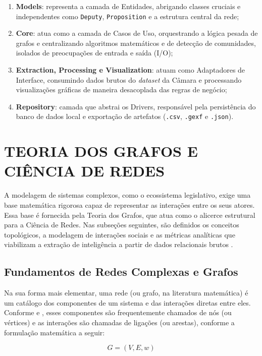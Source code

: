 \documentclass[
      12pt,
      a4paper,
      openright,
      oneside,
      chapter=TITLE,
      section=TITLE,
      english,
      french,
      spanish,
      brazilian
    ]{abntex2}
\begin{document}
    \begin{enumerate}[label=\alph*)]
        \item \textbf{Models}: representa a camada de Entidades, abrigando classes cruciais e independentes como \texttt{Deputy}, \texttt{Proposition} e a estrutura central da rede;
        \item \textbf{Core}: atua como a camada de Casos de Uso, orquestrando a lógica pesada de grafos e centralizando algoritmos matemáticos e de detecção de comunidades, isolados de preocupações de entrada e saída (I/O);
        \item \textbf{Extraction, Processing e Visualization}: atuam como Adaptadores de Interface, consumindo dados brutos do \textit{dataset} da Câmara e processando visualizações gráficas de maneira desacoplada das regras de negócio;
        \item \textbf{Repository}: camada que abstrai os Drivers, responsável pela persistência do banco de dados local e exportação de artefatos (\texttt{.csv}, \texttt{.gexf} e \texttt{.json}).
    \end{enumerate}
    
    \section{TEORIA DOS GRAFOS E CIÊNCIA DE REDES}
    A modelagem de sistemas complexos, como o ecossistema legislativo, exige uma base matemática rigorosa capaz de representar as interações entre os seus atores. Essa base é fornecida pela Teoria dos Grafos, que atua como o alicerce estrutural para a Ciência de Redes. Nas subseções seguintes, são definidos os conceitos topológicos, a modelagem de interações sociais e as métricas analíticas que viabilizam a extração de inteligência a partir de dados relacionais brutos \cite{newman2010, diestel2017}.
    \subsection{Fundamentos de Redes Complexas e Grafos}
    
    Na sua forma mais elementar, uma rede (ou grafo, na literatura matemática) é um catálogo dos componentes de um sistema e das interações diretas entre eles. Conforme  e , esses componentes são frequentemente chamados de nós (ou vértices) e as interações são chamadas de ligações (ou arestas), conforme a formulação matemática a seguir:
    
    \begin{equation}
    G = (V, E, w)
    \end{equation}
    
\end{document}
